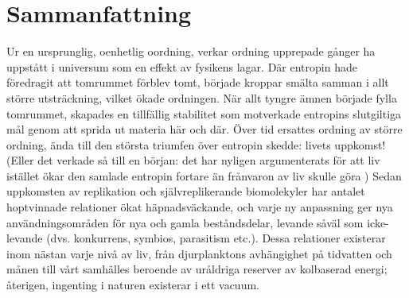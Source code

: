 


\chapter{Sammanfattning}
Ur en ursprunglig, oenhetlig oordning, verkar ordning upprepade gånger ha uppstått i universum som en effekt av fysikens lagar. Där entropin hade föredragit att tomrummet förblev tomt, började kroppar smälta samman i allt större utsträckning, vilket ökade ordningen. När allt tyngre ämnen började fylla tomrummet, skapades en tillfällig stabilitet som motverkade entropins slutgiltiga mål genom att sprida ut materia här och där. Över tid ersattes ordning av större ordning, ända till den största triumfen över entropin skedde: livets uppkomst! (Eller det verkade så till en början: det har nyligen argumenterats för att liv istället ökar den samlade entropin fortare än frånvaron av liv skulle göra \citep{england2013statistical}) Sedan uppkomsten av replikation och självreplikerande biomolekyler har antalet hoptvinnade relationer ökat häpnadsväckande, och varje ny anpassning ger nya användningsområden för nya och gamla beståndsdelar, levande såväl som icke-levande (dvs. konkurrens, symbios, parasitism etc.). Dessa relationer existerar inom nästan varje nivå av liv, från djurplanktons avhängighet på tidvatten och månen till vårt samhälles beroende av uråldriga reserver av kolbaserad energi; återigen, ingenting i naturen existerar i ett vacuum.


